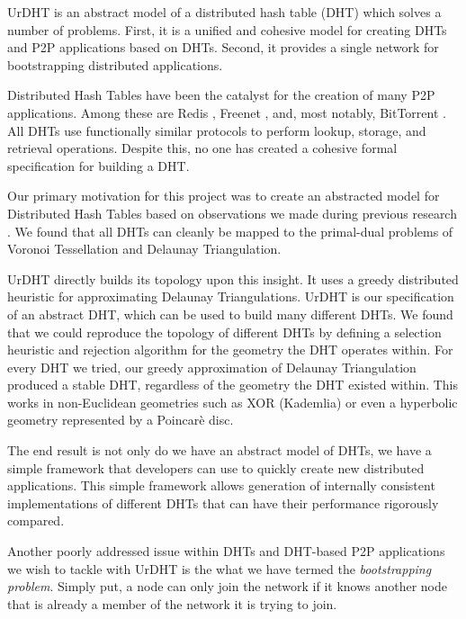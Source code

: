 \documentclass[11pt,conference]{IEEEtran}
\begin{document}
UrDHT is an abstract model of a distributed hash table (DHT) which solves a number of problems.
First, it is a unified and cohesive model for creating DHTs and P2P applications based on DHTs.
Second, it provides a single network for bootstrapping distributed applications.
%

Distributed Hash Tables have been the catalyst for the creation of many P2P applications.
Among these are Redis \cite{redis}, Freenet \cite{freenet}, and, most notably, BitTorrent \cite{bittorrent}. 
All DHTs use functionally similar protocols to perform lookup, storage, and retrieval operations.
Despite this, no one has created a cohesive formal specification for building a DHT.

Our primary motivation for this project was to create an abstracted model for Distributed Hash Tables based on observations we made during previous research \cite{dgvh}.
We found that all DHTs can cleanly be mapped to the primal-dual problems of Voronoi Tessellation and Delaunay Triangulation.

UrDHT directly builds its topology upon this insight.
It uses a greedy distributed heuristic for approximating Delaunay Triangulations.
UrDHT is our specification of an abstract DHT, which can be used to build many different DHTs.
We found that we could reproduce the topology of different DHTs by defining a selection heuristic and rejection algorithm for the geometry the DHT operates within.
For every DHT we tried, our greedy approximation of Delaunay Triangulation %
produced a stable DHT, regardless of the geometry the DHT existed within.  
This works in non-Euclidean geometries such as XOR (Kademlia) or even a hyperbolic geometry represented by a Poincar\`{e} disc.

The end result is not only do we have an abstract model of DHTs, we have a simple framework that developers can use to quickly create new distributed applications.
This simple framework allows generation of internally consistent implementations of different DHTs that can have their performance rigorously compared.  %



Another poorly addressed issue within DHTs and DHT-based P2P applications we wish to tackle with UrDHT is the what we have termed the \textit{bootstrapping problem}.
Simply put, a node can only join the network if it knows another node that is already a member of the network it is trying to join.
\end{document}
